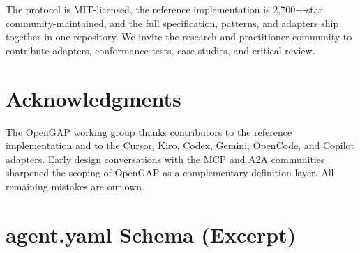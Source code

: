 \documentclass[11pt,a4paper]{article}
\begin{document}
The protocol is MIT-licensed, the reference implementation is 2{,}700+-star
community-maintained, and the full specification, patterns, and adapters ship together
in one repository. We invite the research and practitioner community to contribute
adapters, conformance tests, case studies, and critical review.

\section*{Acknowledgments}
\noindent
The OpenGAP working group thanks contributors to the reference implementation and to
the Cursor, Kiro, Codex, Gemini, OpenCode, and Copilot adapters. Early design
conversations with the MCP and A2A communities sharpened the scoping of OpenGAP as a
complementary definition layer. All remaining mistakes are our own.




\newpage
\appendix

\section{agent.yaml Schema (Excerpt)}\label{app:schema}
\end{document}
